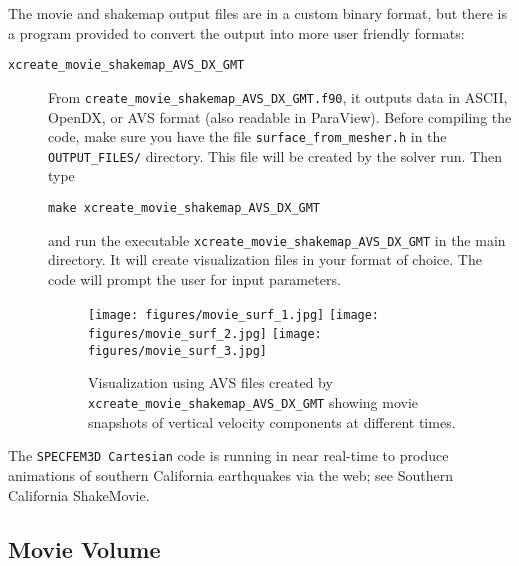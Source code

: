 The movie and shakemap output files are in a custom binary format, but there is
a program provided to convert the output into more user friendly formats:
\begin{description}
\item [{\texttt{xcreate\_movie\_shakemap\_AVS\_DX\_GMT}}]
From \texttt{create\_movie\_shakemap\_AVS\_DX\_GMT.f90},
it outputs data in ASCII, OpenDX, or AVS format (also readable in
ParaView). Before compiling the code, make sure you have the file
\texttt{surface\_from\_mesher.h} in the \texttt{OUTPUT\_FILES/} directory.
This file will be created by the solver run. Then type

{\footnotesize
\begin{verbatim}
make xcreate_movie_shakemap_AVS_DX_GMT
\end{verbatim}
}
and run the executable \texttt{xcreate\_movie\_shakemap\_AVS\_DX\_GMT}
in the main directory. It will create visualization files
in your format of choice. The code will prompt the user for input
parameters.


\begin{figure}[htbp]
\begin{centering}
\texttt{[image: figures/movie\_surf\_1.jpg]}
\texttt{[image: figures/movie\_surf\_2.jpg]}
\texttt{[image: figures/movie\_surf\_3.jpg]}
\par
\end{centering}
\caption{Visualization using AVS files created by \texttt{xcreate\_movie\_shakemap\_AVS\_DX\_GMT}
showing movie snapshots of vertical velocity components at different times.}
\label{fig:movie.surf}
\end{figure}

\end{description}
The \texttt{SPECFEM3D Cartesian} code is running in near real-time
to produce animations of southern California earthquakes via the web;
see Southern California ShakeMovie\textregistered{}.


\subsection{Movie Volume}\label{sub:Movie-Volume}

